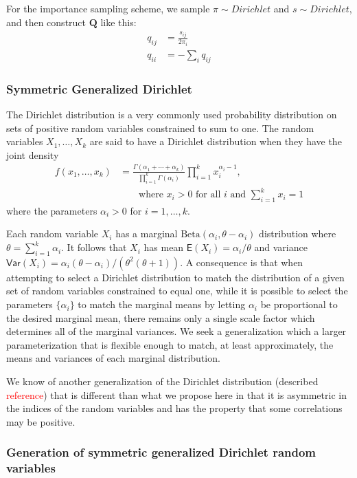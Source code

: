 \documentclass[conference]{IEEEtran}
\newcommand{\falta}[1]{\textcolor{red}{#1}}
\begin{document}
For the importance sampling scheme, we sample $\pi\sim Dirichlet$ and
$s\sim Dirichlet$, and then construct $\mathbf{Q}$ like this:
\begin{align*}
q_{ij} &= \frac{s_{ij}}{2\pi_i} \\
q_{ii} &= -\sum_i q_{ij}
\end{align*}

\subsubsection*{Symmetric Generalized Dirichlet}
The Dirichlet distribution is a very commonly used probability distribution
on sets of positive random variables constrained to sum to one.
The random variables $X_1,\ldots,X_k$ are said to have a Dirichlet distribution
when they have the joint density
\begin{align*}
f(x_1,\ldots,x_k) &= \frac{\Gamma(\alpha_1 + \cdots + \alpha_k)}{\prod_{i=1}^k \Gamma(\alpha_i)} \prod_{i=1}^k x_i^{\alpha_i - 1},\\ &\qquad \text{where $x_i > 0$ for all $i$ and $\sum_{i=1}^k x_i = 1$}
\end{align*}
where the parameters $\alpha_i > 0$ for $i=1,\ldots,k$.

Each random variable $X_i$ has a marginal
$\text{Beta}(\alpha_i,\theta-\alpha_i)$ distribution where $\theta =
\sum_{i=1}^k \alpha_i$.  It follows that $X_i$ has mean
$\mathsf{E}(X_i) = \alpha_i/\theta$ and variance $\mathsf{Var}(X_i) =
\alpha_i(\theta-\alpha_i) / ( \theta^2(\theta+1) )$.  A consequence is
that when attempting to select a Dirichlet distribution to match the
distribution of a given set of random variables constrained to equal
one, while it is possible to select the parameters $\{\alpha_i\}$ to
match the marginal means by letting $\alpha_i$ be proportional to the
desired marginal mean, there remains only a single scale factor which
determines all of the marginal variances.  We seek a generalization
which a larger parameterization that is flexible enough to match, at
least approximately, the means and variances of each marginal
distribution.

We know of another generalization of the Dirichlet distribution
(described \falta{reference}) that is different than what we propose
here in that it is asymmetric in the indices of the random variables
and has the property that some correlations may be positive.

\subsubsection*{Generation of symmetric generalized Dirichlet random variables}
\end{document}
